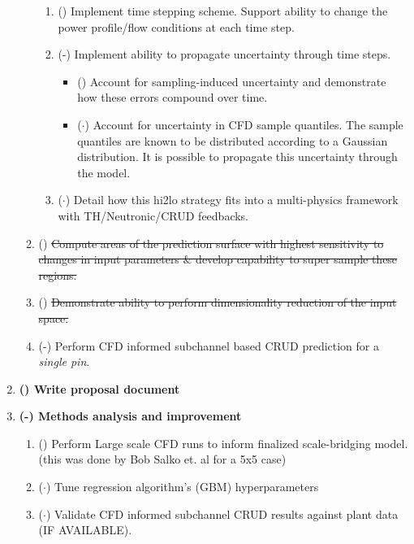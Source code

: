 \begin{enumerate}
\begin{enumerate}
        \begin{enumerate}
            \item (\checkmark) Implement time stepping scheme.  Support ability to change the power profile/flow conditions at each time step.
            \item (\checkmark-) Implement ability to propagate uncertainty through time steps.
            \begin{itemize}
                \item (\checkmark) Account for sampling-induced uncertainty and demonstrate how these errors compound over time.
                \item ($\cdot$) {\color{blue} Account for uncertainty in CFD sample quantiles. The sample quantiles are known
                                    to be distributed according to a Gaussian distribution.  It is possible to propagate
                                    this uncertainty through the model.}
            \end{itemize}
        \item ($\cdot$) {\color{blue} Detail how this hi2lo strategy fits into a multi-physics framework with TH/Neutronic/CRUD feedbacks.}
        \end{enumerate}
        \item (\xmark) \sout{Compute areas of the prediction surface with highest
                             sensitivity to changes in input parameters \& develop capability to super sample these regions.}
        \item (\xmark) \sout{Demonstrate ability to perform dimensionality reduction of the input space.}
        \item (\checkmark-) Perform CFD informed subchannel based CRUD prediction for a \emph{single pin}.
    \end{enumerate}
\item \textbf{(\checkmark) Write proposal document}
\item \textbf{(\checkmark-) Methods analysis and improvement}
    \begin{enumerate}
        \item (\checkmark) Perform Large scale CFD runs to inform finalized scale-bridging model.  (this was done by Bob Salko et. al for a 5x5 case)
        \item ($\cdot$) Tune regression algorithm's (GBM) hyperparameters
        \item ($\cdot$) Validate CFD informed subchannel CRUD results against plant data (IF AVAILABLE).

\end{enumerate}
\end{enumerate}
